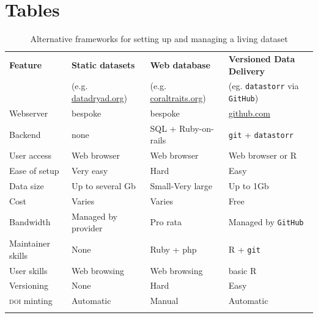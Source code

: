 \documentclass[a4paper,11pt]{article}
\newcommand{\smurl}[1]{{\footnotesize\href{https://#1}{#1}}}
\begin{document}
\newpage

\section{Tables}

\begin{table}[h!]
\centering
\caption{Alternative frameworks for setting up and managing a living dataset}
{\footnotesize
\vspace{1cm}
  \begin{tabular}{p{2.5cm}p{3.5cm}p{3.5cm}p{4cm}}
  \hline
  \textbf{Feature} & \textbf{Static datasets}& \textbf{Web database} & \textbf{Versioned Data Delivery}\\
  \textbf{} & (e.g. \smurl{datadryad.org})& (e.g. \smurl{coraltraits.org}) & (eg. \texttt{datastorr} via \texttt{GitHub})\\
  \hline
   Webserver        & bespoke & bespoke &  \smurl{github.com}\\
   Backend          & none & SQL + Ruby-on-rails 			& \texttt{git} + \texttt{datastorr} \\
   User access      & Web browser & Web browser 				    & Web browser or R \\
   Ease of setup    & Very easy & Hard 							& Easy\\
   Data size        & Up to several Gb & Small-Very large 				& Up to 1Gb\\
   Cost             & Varies & Varies  						& Free \\
   Bandwidth        & Managed by provider & Pro rata 						& Managed by \texttt{GitHub}\\
   Maintainer skills & None & Ruby + php 					& R + \texttt{git} \\
   User skills      &Web browsing& Web browsing  					& basic R \\
   Versioning       &None& Hard 							& Easy \\
   \textsc{doi} minting      &Automatic & Manual 					& Automatic \\
  \hline 
  \\
 
  \end{tabular}
  } 
\label{tab:publishing_models}
\end{table}

\newpage
\end{document}
